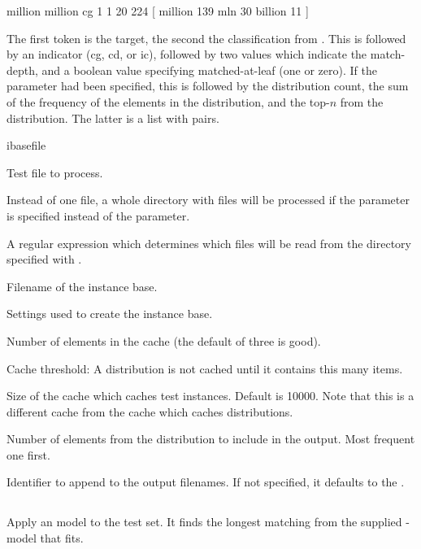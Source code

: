 \documentclass[a4paper,10pt,twoside]{report}
\begin{document}
\begin{wout}{}
million million cg 1 1 20 224 [ million 139 mln 30 billion 11 ]
\end{wout}

The first token is the target, the second the classification from
\Timbl{}. This is followed by an indicator (cg, cd, or ic), followed
by two values which indicate the match-depth, and a boolean value
specifying matched-at-leaf (one or zero). If the  parameter
had been specified, this is followed by the distribution count, the
sum of the frequency of the elements in the distribution, and the
top-$n$ from the distribution. The latter is a list with
 pairs.

\begin{varlist}{ibasefile}
\item[filename] Test file to process.
\item[dir] Instead of one file, a whole directory with files will be
  processed if the  parameter is specified instead of the
   parameter.
\item[dirmatch] A regular expression which determines which files will
  be read from the directory specified with .
\item[ibasefile] Filename of the instance base.
\item[timbl] Settings used to create the instance base.
\item[cache] Number of elements in the cache (the default of three is
  good). 
\item[cth] Cache threshold: A distribution is not cached until it
  contains this many items.
\item[cs] Size of the cache which caches test instances. Default is
  \num{10000}. Note that this is a different cache from the cache which
  caches distributions. 
\item[topn] Number of elements from the \Timbl{} distribution to
  include in the output. Most frequent one first.
\item[id] Identifier to append to the output filenames. If not
  specified, it defaults to the \pid{}.
\end{varlist}

\subsection{}

Apply an \ngram{} model to the test set. It finds the longest matching
\ngram{} from the supplied \ngram{}-model that fits.
\end{document}
